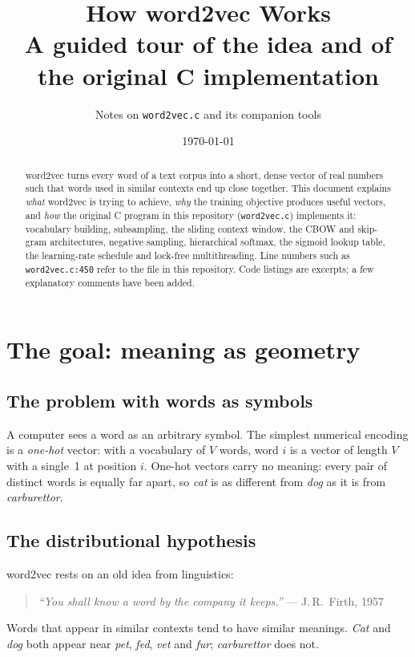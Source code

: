 \documentclass[11pt,a4paper]{article}
\title{\textbf{How word2vec Works}\\[4pt]
\large A guided tour of the idea and of the original C implementation}
\author{Notes on \texttt{word2vec.c} and its companion tools}
\date{\today}
\newcommand{\code}[1]{\texttt{#1}}
\newcommand{\src}[1]{\texttt{word2vec.c:#1}}
\begin{document}
\maketitle

\begin{abstract}
word2vec turns every word of a text corpus into a short, dense vector of real
numbers such that words used in similar contexts end up close together. This
document explains \emph{what} word2vec is trying to achieve, \emph{why} the
training objective produces useful vectors, and \emph{how} the original C program in
this repository (\code{word2vec.c}) implements it: vocabulary building,
subsampling, the sliding context window, the CBOW and skip-gram architectures,
negative sampling, hierarchical softmax, the sigmoid lookup table, the learning-rate
schedule and lock-free multithreading. Line numbers such as \src{450} refer to
the file in this repository. Code listings are excerpts; a few explanatory comments
have been added.
\end{abstract}

\tableofcontents
\newpage

\section{The goal: meaning as geometry}

\subsection{The problem with words as symbols}

A computer sees a word as an arbitrary symbol. The simplest numerical encoding is
a \emph{one-hot} vector: with a vocabulary of $V$ words, word $i$ is a vector of
length $V$ with a single~1 at position $i$. One-hot vectors carry no meaning:
every pair of distinct words is equally far apart, so \emph{cat} is as different
from \emph{dog} as it is from \emph{carburettor}.

\subsection{The distributional hypothesis}

word2vec rests on an old idea from linguistics:
\begin{quote}
\emph{``You shall know a word by the company it keeps.''} --- J.\,R.~Firth, 1957
\end{quote}
Words that appear in similar contexts tend to have similar meanings. \emph{Cat}
and \emph{dog} both appear near \emph{pet}, \emph{fed}, \emph{vet} and
\emph{fur}; \emph{carburettor} does not.
\end{document}
